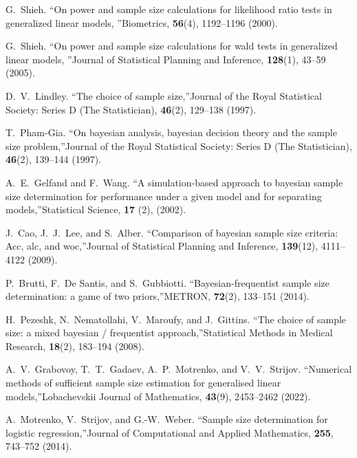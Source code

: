 \documentclass[
11pt,%
tightenlines,%
twoside,%
onecolumn,%
nofloats,%
nobibnotes,%
nofootinbib,%
superscriptaddress,%
noshowpacs,%
centertags]%
{revtex4-2}
\begin{document}
\begin{thebibliography}{99}
G.~Shieh. \textquotedblleft On power and sample size calculations for likelihood ratio tests in generalized linear models, \textquotedblright Biometrics, \textbf{56}(4), 1192--1196 (2000).

G.~Shieh. \textquotedblleft On power and sample size calculations for wald tests in generalized linear models, \textquotedblright Journal of Statistical Planning and Inference, \textbf{128}(1), 43--59 (2005).

D.~V.~Lindley. \textquotedblleft The choice of sample size,\textquotedblright Journal of the Royal Statistical Society: Series D (The Statistician), \textbf{46}(2), 129--138 (1997).

T.~Pham-Gia. \textquotedblleft On bayesian analysis, bayesian decision theory and the sample size problem,\textquotedblright Journal of the Royal Statistical Society: Series D (The Statistician), \textbf{46}(2), 139--144 (1997).

A.~E.~Gelfand and F.~Wang. \textquotedblleft A simulation-based approach to bayesian sample size determination for performance under a given model and for separating models,\textquotedblright Statistical Science, \textbf{17} (2), (2002).

J.~Cao, J.~J.~Lee, and S.~Alber. \textquotedblleft Comparison of bayesian sample size criteria: Acc, alc, and woc,\textquotedblright Journal of Statistical Planning and Inference, \textbf{139}(12), 4111--4122 (2009).

P.~Brutti, F.~De Santis, and S.~Gubbiotti. \textquotedblleft Bayesian-frequentist sample size determination: a game of two priors,\textquotedblright METRON, \textbf{72}(2), 133--151 (2014).

H.~Pezeshk, N.~Nematollahi, V.~Maroufy, and J.~Gittins. \textquotedblleft The choice of sample size: a mixed bayesian / frequentist approach,\textquotedblright Statistical Methods in Medical Research, \textbf{18}(2), 183--194 (2008).

A.~V.~Grabovoy, T.~T.~Gadaev, A.~P.~Motrenko, and V.~V.~Strijov. \textquotedblleft Numerical methods of sufficient sample size estimation for generalised linear models,\textquotedblright Lobachevskii Journal of Mathematics, \textbf{43}(9), 2453--2462 (2022).

A.~Motrenko, V.~Strijov, and G.-W.~Weber. \textquotedblleft Sample size determination for logistic regression,\textquotedblright Journal of Computational and Applied Mathematics, \textbf{255}, 743--752 (2014).


\end{thebibliography}
\end{document}
